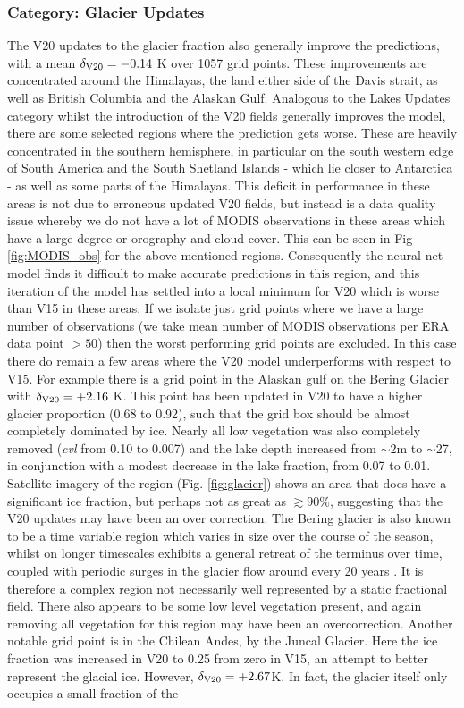 \documentclass[twocolumn]{article}
\begin{document}
	
	\subsubsection{Category: Glacier Updates}\label{V20Glacier}
	The V20 updates to the glacier fraction also generally improve the predictions, with a mean $\delta_{\rm V20} = -0.14$ K over 1057 grid points. These improvements are concentrated around the Himalayas, the land either side of the Davis strait, as well as British Columbia and the Alaskan Gulf. Analogous to the Lakes Updates category whilst the introduction of the V20 fields generally improves the model, there are some selected regions where the  prediction gets worse. These are heavily concentrated in the southern hemisphere, in particular on the south western edge of South America and the South Shetland Islands - which lie closer to Antarctica - as well as some parts of the Himalayas. This deficit in performance in these areas is not due to erroneous updated V20 fields, but instead is a data quality issue whereby we do not have a lot of MODIS observations in these areas which have a large degree or orography and cloud cover. This can be seen in Fig \ref{fig:MODIS_obs} for the above mentioned regions. Consequently the neural net model finds it difficult to make accurate predictions in this region, and this iteration of the model has settled into a local minimum for V20 which is worse than V15 in these areas. If we isolate just grid points where we have a large number of observations (we take mean number of MODIS  observations per ERA data point $> 50$) then the worst performing grid points are excluded. In this case there do remain a few areas where the V20 model underperforms with respect to V15. For example there is a grid point in the Alaskan gulf on the Bering Glacier with $\delta_{\rm V20} = +2.16$ K. This point has been updated in V20 to have a higher glacier proportion (0.68 to 0.92), such that the grid box should be almost completely dominated by ice. Nearly all low vegetation was also completely removed (\textit{cvl} from 0.10 to 0.007) and the lake depth increased from $\sim 2$m to $\sim$27, in conjunction with a modest decrease in the lake fraction, from 0.07 to 0.01. Satellite imagery of the region (Fig. \ref{fig:glacier}) shows an area that does have a significant ice fraction, but perhaps not as great as $\gtrsim 90 \%$, suggesting that the V20 updates may have been an over correction. The Bering glacier is also known to be a time variable region which varies in size over the course of the season, whilst on longer timescales exhibits a general retreat of the terminus over time, coupled with periodic surges in the glacier flow around every 20 years \cite{Bering2010}. It is therefore a complex region not necessarily well represented by a static fractional field. There also appears to be some low level vegetation present, and again removing all vegetation for this region may have been an overcorrection. Another notable grid point is in the Chilean Andes, by the Juncal Glacier. Here the ice fraction was increased in V20 to 0.25 from zero in V15, an attempt to better represent the glacial ice. However, $\delta_{\rm V20} = +2.67$K. In fact, the glacier itself only occupies a small fraction of the 
\end{document}
